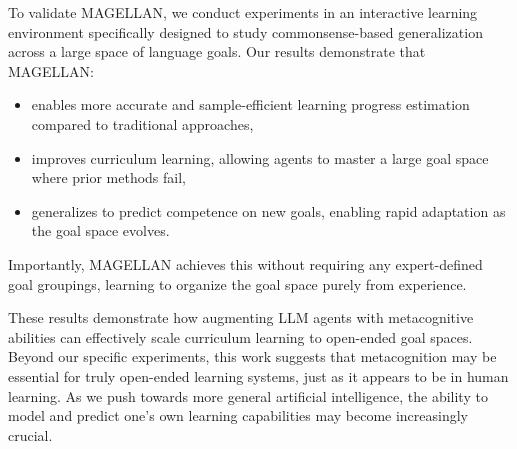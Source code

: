 To validate MAGELLAN, we conduct experiments in an interactive learning environment specifically designed to study commonsense-based generalization across a large space of language goals. Our results demonstrate that MAGELLAN:
\begin{itemize}[noitemsep,topsep=0pt,parsep=0pt,partopsep=0pt,leftmargin=15pt]
    \item enables more accurate and sample-efficient learning progress estimation compared to traditional approaches,
    \item improves curriculum learning, allowing agents to master a large goal space where prior methods fail, 
    \item generalizes to predict competence on new goals, enabling rapid adaptation as the goal space evolves.   
\end{itemize}
Importantly, MAGELLAN achieves this without requiring any expert-defined goal groupings, learning to organize the goal space purely from experience. 

These results demonstrate how augmenting LLM agents with metacognitive abilities can effectively scale curriculum learning to open-ended goal spaces. Beyond our specific experiments, this work suggests that metacognition may be essential for truly open-ended learning systems, just as it appears to be in human learning. As we push towards more general artificial intelligence, the ability to model and predict one's own learning capabilities may become increasingly crucial.

